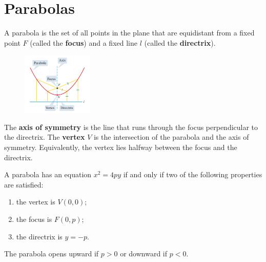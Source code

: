 
\section{Parabolas}


\begin{definition}

A parabola is the set of all points in the plane that are equidistant from a fixed point $F$ (called the \textbf{focus}) and a fixed line $l$ (called the \textbf{directrix}).
\end{definition}
\begin{figure}
   \centering
   \includegraphics[width=0.3\textwidth,keepaspectratio]{figs/parabola-concepts.png}
\end{figure}
The \textbf{axis of symmetry} is the line that runs through the focus perpendicular to the directrix. The \textbf{vertex} $V$ is the intersection of the parabola and the axis of symmetry. Equivalently, the vertex lies halfway between the focus and the directrix.

\begin{theorem}
A parabola has an equation $x^2=4py$ if and only if two of the following properties are satisfied:
\begin{enumerate}[sepno]
    \item the vertex is $V(0, 0)$;
    \item the focus is $F(0, p)$;
    \item the directrix is $y=-p$.
\end{enumerate}

The parabola opens upward if $p>0$ or downward if $p<0$.
\end{theorem}

